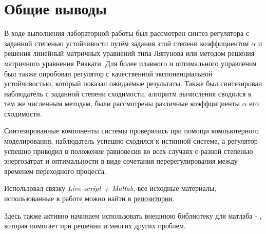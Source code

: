 \chapter{Общие выводы}
\label{ch:chap6}

В ходе выполнения лабораторной работы был рассмотрен синтез регулятора с заданной степенью устойчивости путём задания этой степени коэффициентом $\alpha$ и решения линейный матричных уравнений типа Ляпунова или 
методом решения матричного уравнения Риккати. Для более плавного и оптимального управления был также опробован регулятор с качественной экспоненциальной устойчивостью, который показал ожидаемые результаты.
Также был синтезирован наблюдатель с заданной степени сходимости, алгоритм вычисления сводился к тем же численным методам, были рассмотрены различные коэффцициенты $\alpha$ его сходимости.

Синтезированные компоненты системы проверялись при помощи компьютерного моделирования, наблюдатель успешно сходился к истинной системе, 
а регулятор успешно приводил в положение равновесия во всех случаях с разной степенью энергозатрат и оптимальности в виде сочетания перерегулирования между временем переходного процесса.

Использовал связку \textit{Live-script + Matlab}, все исходные материалы, использованные в работе можно найти  в \href{https://github.com/GreedlyCore/control_theory_course}{репозитории}.

Здесь также активно начинаем использовать внешнюю библиотеку для матлаба - , которая помогает при решении  и многих других проблем.
\endinput
